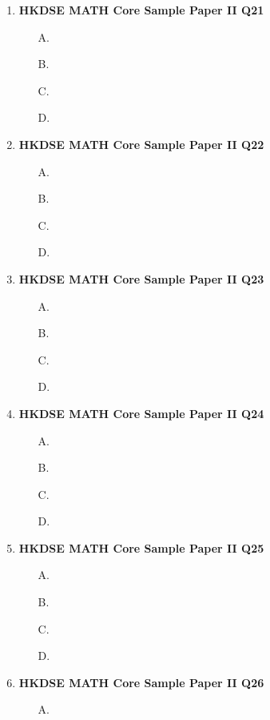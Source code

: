 \documentclass[12pt]{article}
\begin{document}
\begin{enumerate}
\begin{enumerate}
		\item[D.]
	\end{enumerate}
	\item \textbf{HKDSE MATH Core Sample Paper II Q21}\\
	\begin{enumerate}
		\item[A.]
		\item[B.]
		\item[C.]
		\item[D.]
	\end{enumerate}
	\item \textbf{HKDSE MATH Core Sample Paper II Q22}\\
	\begin{enumerate}
		\item[A.]
		\item[B.]
		\item[C.]
		\item[D.]
	\end{enumerate}
	\item \textbf{HKDSE MATH Core Sample Paper II Q23}\\
	\begin{enumerate}
		\item[A.]
		\item[B.]
		\item[C.]
		\item[D.]
	\end{enumerate}
	\item \textbf{HKDSE MATH Core Sample Paper II Q24}\\
	\begin{enumerate}
		\item[A.]
		\item[B.]
		\item[C.]
		\item[D.]
	\end{enumerate}
	\item \textbf{HKDSE MATH Core Sample Paper II Q25}\\
	\begin{enumerate}
		\item[A.]
		\item[B.]
		\item[C.]
		\item[D.]
	\end{enumerate}
	\item \textbf{HKDSE MATH Core Sample Paper II Q26}\\
	\begin{enumerate}
		\item[A.]

\end{enumerate}
\end{enumerate}
\end{document}
